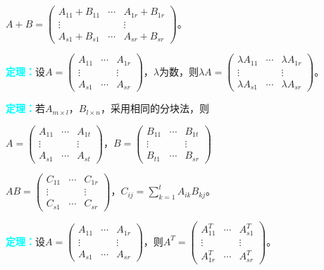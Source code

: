 \documentclass[UTF8, 12pt]{ctexart}
\begin{document}
$A+B=\left(
    \begin{array}{ccc}
        A_{11}+B_{11} & \cdots & A_{1r}+B_{1r} \\
        \vdots & & \vdots \\
        A_{s1}+B_{s1} & \cdots & A_{sr}+B_{sr}
    \end{array}
\right)\text{。}$

\textcolor{aqua}{\textbf{定理：}}设$A=\left(
    \begin{array}{ccc}
        A_{11} & \cdots & A_{1r} \\
        \vdots & & \vdots \\
        A_{s1} & \cdots & A_{sr}
    \end{array}
\right)$，$\lambda$为数，则$\lambda A=\left(
    \begin{array}{ccc}
        \lambda A_{11} & \cdots & \lambda A_{1r} \\
        \vdots & & \vdots \\
        \lambda A_{s1} & \cdots & \lambda A_{sr}
    \end{array}
\right)$。\medskip

\textcolor{aqua}{\textbf{定理：}}若$A_{m\times l}$，$B_{l\times n}$，采用相同的分块法，则 \medskip

$A=\left(
    \begin{array}{ccc}
        A_{11} & \cdots & A_{1t} \\
        \vdots & & \vdots \\
        A_{s1} & \cdots & A_{st}
    \end{array}
\right)\text{，}B=\left(
    \begin{array}{ccc}
        B_{11} & \cdots & B_{1t} \\
        \vdots & & \vdots \\
        B_{t1} & \cdots & B_{sr}
    \end{array}
\right)$

$AB=\left(
    \begin{array}{ccc}
        C_{11} & \cdots & C_{1r} \\
        \vdots & & \vdots \\
        C_{s1} & \cdots & C_{sr}
    \end{array}
\right)\text{，}C_{ij}=\sum\limits_{k=1}^tA_{ik}B_{kj}\text{。}$

\textcolor{aqua}{\textbf{定理：}}设$A=\left(
    \begin{array}{ccc}
        A_{11} & \cdots & A_{1r} \\
        \vdots & & \vdots \\
        A_{s1} & \cdots & A_{sr}
    \end{array}
\right)$，则$A^T=\left(
    \begin{array}{ccc}
        A_{11}^T & \cdots & A_{s1}^T \\
        \vdots & & \vdots \\
        A_{1r}^T & \cdots & A_{sr}^T
    \end{array}
\right)$。 \medskip
\end{document}
